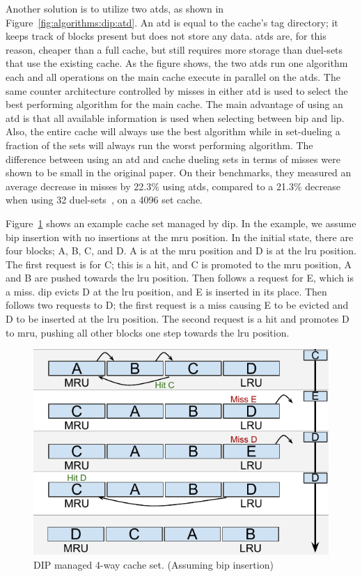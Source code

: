 Another solution is to utilize two \glspl{atd}, as shown in Figure~\ref{fig:algorithms:dip:atd}.
An \gls{atd} is equal to the cache's tag directory; it keeps track of blocks present but does not store any data.
\glspl{atd} are, for this reason, cheaper than a full cache, but still requires more storage than duel-sets that use the existing cache.
As the figure shows, the two \glspl{atd} run one algorithm each and all operations on the main cache execute in parallel on the \glspl{atd}.
The same counter architecture controlled by misses in either \gls{atd} is used to select the best performing algorithm for the main cache.
The main advantage of using an \gls{atd} is that all available information is used when selecting between \gls{bip} and \gls{lip}.
Also, the entire cache will always use the best algorithm while in set-dueling a fraction of the sets will always run the worst performing algorithm.
The difference between using an \gls{atd} and cache dueling sets in terms of misses were shown to be small in the original paper.
On their benchmarks, they measured an average decrease in misses by 22.3\% using \glspl{atd}, compared to a 21.3\% decrease when using 32 duel-sets~\cite{Qureshi2007}, on a 4096 set cache.

Figure~\ref{fig:algorithms:bip_example} shows an example cache set managed by \gls{dip}.
In the example, we assume \gls{bip} insertion with no insertions at the \gls{mru} position.
In the initial state, there are four blocks; A, B, C, and D.
A is at the \gls{mru} position and D is at the \gls{lru} position.
The first request is for C; this is a hit, and C is promoted to the \gls{mru} position, A and B are pushed towards the \gls{lru} position.
Then follows a request for E, which is a miss.
\gls{dip} evicts D at the \gls{lru} position, and E is inserted in its place.
Then follows two requests to D; the first request is a miss causing E to be evicted and D to be inserted at the \gls{lru} position.
The second request is a hit and promotes D to \gls{mru}, pushing all other blocks one step towards the \gls{lru} position.

\begin{figure}[ht]
    \centering
    \includegraphics[width=.65\textwidth]{figures/algorithms/DIP}
    \caption[DIP managed 4-way cache set.]{DIP managed 4-way cache set. (Assuming \gls{bip} insertion)}
    \label{fig:algorithms:bip_example}
\end{figure}

